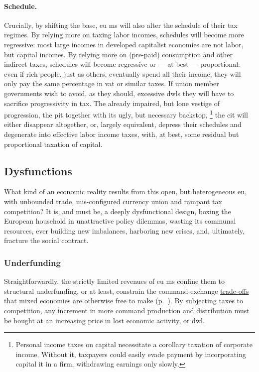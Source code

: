 \paragraph{Schedule.}
Crucially, by shifting the base, \gls{eu} \gls{ms} will also alter the schedule of their tax regimes.
By relying more on taxing labor incomes, schedules will become more regressive:
most large incomes in developed capitalist economies are not labor, but capital incomes.
By relying more on (pre-paid) consumption and other indirect taxes, schedules will become regressive or --- at best --- proportional:
even if rich people, just as others, eventually spend all their income, they will only pay the same percentage in \gls{vat} or similar taxes.
If union member governments wish to avoid, as they should, excessive \glspl{dwl} they will have to sacrifice progressivity in tax.
The already impaired, but lone vestige of progression, the \gls{pit} together with its ugly, but necessary backstop,
\footnote{
	Personal income taxes on capital necessitate a corollary taxation of corporate income.
	Without it, taxpayers could easily evade payment by incorporating capital it in a firm, withdrawing earnings only slowly.
}
the \gls{cit} will either disappear altogether, or, largely equivalent, depress their schedules and degenerate into effective labor income taxes, with, at best, some residual but proportional taxation of capital.

\subsection{Dysfunctions}
	\label{sec:defunct}
What kind of an economic reality results from this open, but heterogeneous \gls{eu}, with unbounded trade, mis-configured currency union and rampant tax competition?
It is, and must be, a deeply dysfunctional design, boxing the European household in unattractive policy dilemmas, wasting its communal resources, ever building new imbalances, harboring new crises, and, ultimately, fracture the social contract.

\subsubsection{Underfunding}
	\label{sec:public-squalor}
Straightforwardly, the strictly limited revenues of \gls{eu} \gls{ms} confine them to structural underfunding, or at least, constrain the command-exchange \hyperref[sec:trade-offs]{trade-offs} that mixed economies are otherwise free to make (p.~\pageref{sec:trade-offs}).
By subjecting taxes to competition, any increment in more command production and distribution must be bought at an increasing price in lost economic activity, or \gls{dwl}.

